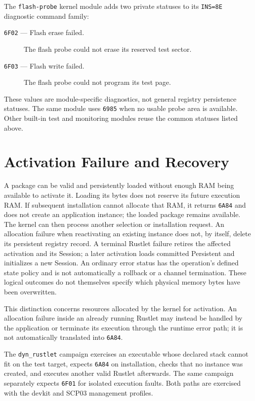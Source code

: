 The \texttt{flash-probe} kernel module adds two private statuses to its
\texttt{INS=8E} diagnostic command family:
\begin{description}
\item[\texttt{6F02} --- Flash erase failed.]
The flash probe could not erase its reserved test sector.
\item[\texttt{6F03} --- Flash write failed.]
The flash probe could not program its test page.
\end{description}
These values are module-specific diagnostics, not general registry persistence
statuses. The same module uses \texttt{6985} when no usable probe area is
available. Other built-in test and monitoring modules reuse the common
statuses listed above.

\section{Activation Failure and Recovery}

A package can be valid and persistently loaded without enough RAM being
available to activate it. Loading its bytes does not reserve its future
execution RAM. If subsequent installation cannot allocate that RAM, it returns
\texttt{6A84} and does not create an application instance; the loaded package
remains available. The kernel can then process another selection or installation
request. An allocation failure when reactivating an existing instance does
not, by itself, delete its persistent registry record. A terminal Rustlet
failure retires the affected activation and its Session; a later activation
loads committed Persistent and initializes a new Session. An ordinary error
status has the operation's defined state policy and is not automatically a
rollback or a channel termination. These logical outcomes do not themselves
specify which physical memory bytes have been overwritten.

This distinction concerns resources allocated by the kernel for activation.
An allocation failure inside an already running Rustlet may instead be handled
by the application or terminate its execution through the runtime error path;
it is not automatically translated into \texttt{6A84}.

The \texttt{dyn\_rustlet} campaign exercises an executable whose declared stack
cannot fit on the test target, expects \texttt{6A84} on installation, checks
that no instance was created, and executes another valid Rustlet afterwards.
The same campaign separately expects \texttt{6F01} for isolated execution
faults. Both paths are exercised with the devkit and SCP03 management profiles.

